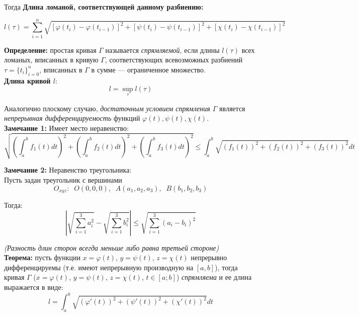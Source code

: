 \documentclass{article}
\begin{document}
  Тогда   \textbf{Длина ломаной, соответствующей данному разбиению:}
  
  \begin{equation}
    l(\tau)=\sum_{i=1}^n\sqrt{[\varphi(t_i)-\varphi(t_{i-1})]^2+[\psi(t_i)-\psi(t_{i-1})]^2+[\chi(t_i)-\chi(t_{i-1})]^2}
  \end{equation}
  
  \textbf{Определение:} простая кривая $\Gamma$ называется \textit{спрямляемой}, если длины $l(\tau)$ всех ломаных, вписанных в кривую $\Gamma$, соответствующих всевозможных разбиений $\tau=\{t_i\}^n_{i=0}$, вписанных в $\Gamma$ в сумме --- ограниченное множество.\\
  
  \textbf{Длина кривой $l$}:
  \begin{equation}
    l=\sup_\tau{l(\tau)}
  \end{equation}
  
  Аналогично плоскому случаю, \textit{достаточным условием спрямления $\Gamma$} является \textit{непрерывная дифференцируемость} функций $\varphi(t), \psi(t), \chi(t)$.\\
  
  \textbf{Замечание 1:} Имеет место неравенство:
  \begin{equation}
    \sqrt{(\int_a^b f_1(t)dt)^2+(\int_a^b f_2(t)dt)^2+(\int_a^b f_3(t)dt)^2}\leq\int_a^b\sqrt{(f_1(t))^2+(f_2(t))^2+(f_3(t))^2}dt
  \end{equation}
  
  \textbf{Замечание 2:} Неравенство треугольника:\\
  
  Пусть задан треугольник с вершинами
  \begin{equation}
    O_{xyz}:\;\; O(0,0,0),\;\; A(a_1,a_2,a_3),\;\; B(b_1,b_2,b_3)
  \end{equation}
  
  Тогда:
  \begin{equation}
    |\sqrt{\sum_{i=1}^3a_i^2}-\sqrt{\sum_{i=1}^3b_i^2}|\leq\sqrt{\sum_{i=1}^3(a_i-b_i)^2}
  \end{equation}
  
  \textit{(Разность длин сторон всегда меньше либо равна третьей стороне)}\\

  \textbf{Теорема:} пусть функции $x=\varphi(t)$, $y=\psi(t)$, $z=\chi(t)$ непрерывно дифференцируемы (т.е. имеют непрерывную производную на $[a,b]$), тогда кривая $\Gamma$ ($x=\varphi(t)$, $y=\psi(t)$, $z=\chi(t)$, $t\in[a;b]$) \textit{спрямляема} и ее длина выражается в виде:
  \begin{equation}
    l=\int_a^b\sqrt{(\varphi'(t))^2+(\psi'(t))^2+(\chi'(t))^2}dt
  \end{equation}
  
\end{document}
